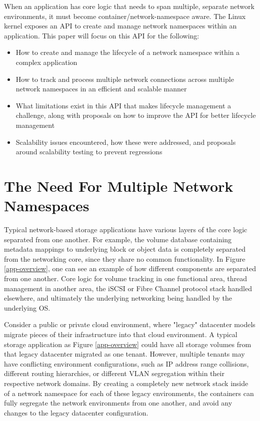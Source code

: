 \documentclass[letterpaper]{article}
\begin{document}
When an application has core logic that needs to span multiple, separate network environments, it must become container/network-namespace aware. The Linux kernel exposes an API to create and manage network namespaces within an application. This paper will focus on this API for the following:
\begin{itemize}
\item How to create and manage the lifecycle of a network namespace within a complex application
\item How to track and process multiple network connections across multiple network namespaces in an efficient and scalable manner
\item What limitations exist in this API that makes lifecycle management a challenge, along with proposals on how to improve the API for better lifecycle management
\item Scalability issues encountered, how these were addressed, and proposals around scalability testing to prevent regressions
\end{itemize}

\section{The Need For Multiple Network Namespaces}
Typical network-based storage applications have various layers of the core logic separated from one another. For example, the volume database containing metadata mappings to underlying block or object data is completely separated from the networking core, since they share no common functionality. In Figure \ref{app-overview}, one can see an example of how different components are separated from one another. Core logic for volume tracking in one functional area, thread management in another area, the iSCSI or Fibre Channel protocol stack handled elsewhere, and ultimately the underlying networking being handled by the underlying OS.

Consider a public or private cloud environment, where "legacy" datacenter models migrate pieces of their infrastructure into that cloud environment. A typical storage application as Figure \ref{app-overview} could have all storage volumes from that legacy datacenter migrated as one tenant. However, multiple tenants may have conflicting environment configurations, such as IP address range collisions, different routing hierarchies, or different VLAN segregation within their respective network domains. By creating a completely new network stack inside of a network namespace for each of these legacy environments, the containers can fully segregate the network environments from one another, and avoid any changes to the legacy datacenter configuration.
\end{document}

